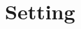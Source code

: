 \documentclass[11pt]{article}
\def\K{{\mathcal K}}
\def\reals{{\mathbb R}}
\newcommand{\norm}[1]{\left\lVert#1\right\rVert}
\def\reals{{\mathbb R}}
\def\by{\mathbf{y}}
\def\bz{\mathbf{z}}
\def\by{\mathbf{y}}
\def\bz{\mathbf{z}}
\numberwithin{equation}{section}
\newcommand{\Return}{\textbf{return} }
\begin{document}








\section{Setting} 
\end{document}
